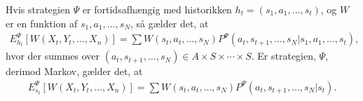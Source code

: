 Hvis strategien $\Psi$ er fortidsafhængig med historikken $h_t=(s_1, a_1 , \dots , s_t)$, og $W$ er en funktion af $s_1, a_1,\dots, s_N$, så gælder det, at
\begin{align*}
    E_{h_t}^\Psi \left[W(X_t , Y_t , \dots , X_n) \right] = \sum W(s_t , a_t , \dots , s_N) P^\Psi (a_t , s_{t+1} , \dots , s_N | s_1 , a_1 , \dots , s_t),
\end{align*}
hvor der summes over $(a_t , s_{t+1} , \dots , s_N) \in A \times S \times \cdots \times S$. Er strategien, $\Psi$, derimod Markov, gælder det, at
\begin{align*}
     E_{s_t}^\Psi \left[W(X_t , Y_t , \dots , X_n) \right] = \sum W(s_t , a_t , \dots , s_N) P^\Psi (a_t , s_{t+1} , \dots , s_N | s_t).
\end{align*}







